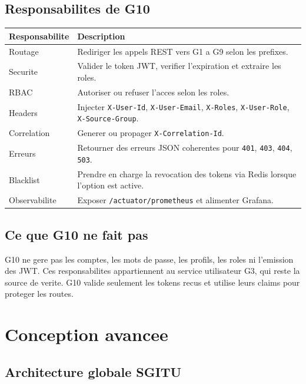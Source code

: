 \documentclass[12pt,a4paper]{article}
\begin{document}
\subsection{Responsabilites de G10}

\begin{longtable}{p{4.5cm}p{10cm}}
\toprule
\textbf{Responsabilite} & \textbf{Description} \\
\midrule
Routage & Rediriger les appels REST vers G1 a G9 selon les prefixes. \\
Securite & Valider le token JWT, verifier l'expiration et extraire les roles. \\
RBAC & Autoriser ou refuser l'acces selon les roles. \\
Headers & Injecter \texttt{X-User-Id}, \texttt{X-User-Email}, \texttt{X-Roles}, \texttt{X-User-Role}, \texttt{X-Source-Group}. \\
Correlation & Generer ou propager \texttt{X-Correlation-Id}. \\
Erreurs & Retourner des erreurs JSON coherentes pour \texttt{401}, \texttt{403}, \texttt{404}, \texttt{503}. \\
Blacklist & Prendre en charge la revocation des tokens via Redis lorsque l'option est active. \\
Observabilite & Exposer \texttt{/actuator/prometheus} et alimenter Grafana. \\
\bottomrule
\end{longtable}

\subsection{Ce que G10 ne fait pas}

\begin{warningBox}
G10 ne gere pas les comptes, les mots de passe, les profils, les roles ni l'emission des JWT. Ces responsabilites appartiennent au service utilisateur G3, qui reste la source de verite. G10 valide seulement les tokens recus et utilise leurs claims pour proteger les routes.
\end{warningBox}

\newpage

\section{Conception avancee}

\subsection{Architecture globale SGITU}
\end{document}
